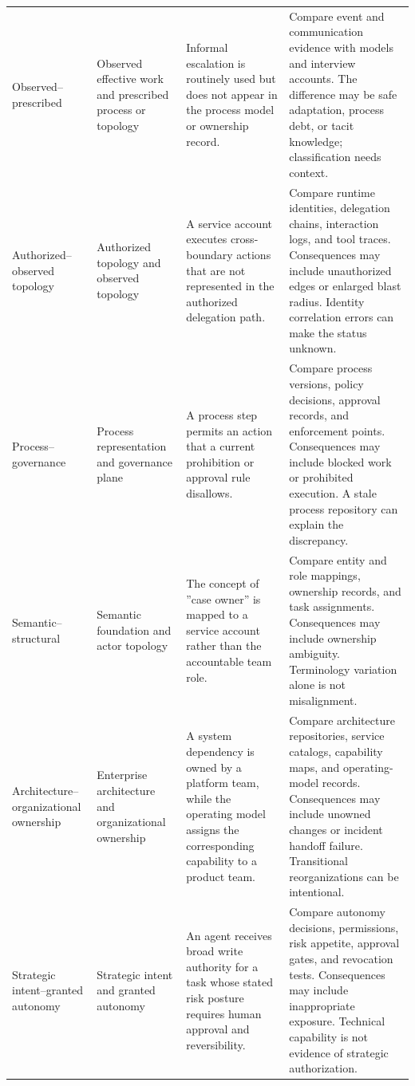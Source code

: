 \documentclass[11pt,letterpaper]{article}
\begin{document}
\begin{longtable}{P{0.15\textwidth} P{0.18\textwidth} P{0.27\textwidth} P{0.30\textwidth}}
Observed--prescribed & Observed effective work and prescribed process or topology & Informal escalation is routinely used but does not appear in the process model or ownership record. & Compare event and communication evidence with models and interview accounts. The difference may be safe adaptation, process debt, or tacit knowledge; classification needs context. \\
Authorized--observed topology & Authorized topology and observed topology & A service account executes cross-boundary actions that are not represented in the authorized delegation path. & Compare runtime identities, delegation chains, interaction logs, and tool traces. Consequences may include unauthorized edges or enlarged blast radius. Identity correlation errors can make the status unknown. \\
Process--governance & Process representation and governance plane & A process step permits an action that a current prohibition or approval rule disallows. & Compare process versions, policy decisions, approval records, and enforcement points. Consequences may include blocked work or prohibited execution. A stale process repository can explain the discrepancy. \\
Semantic--structural & Semantic foundation and actor topology & The concept of ''case owner'' is mapped to a service account rather than the accountable team role. & Compare entity and role mappings, ownership records, and task assignments. Consequences may include ownership ambiguity. Terminology variation alone is not misalignment. \\
Architecture--organizational ownership & Enterprise architecture and organizational ownership & A system dependency is owned by a platform team, while the operating model assigns the corresponding capability to a product team. & Compare architecture repositories, service catalogs, capability maps, and operating-model records. Consequences may include unowned changes or incident handoff failure. Transitional reorganizations can be intentional. \\
Strategic intent--granted autonomy & Strategic intent and granted autonomy & An agent receives broad write authority for a task whose stated risk posture requires human approval and reversibility. & Compare autonomy decisions, permissions, risk appetite, approval gates, and revocation tests. Consequences may include inappropriate exposure. Technical capability is not evidence of strategic authorization. \\
\bottomrule
\end{longtable}
\endgroup
\end{document}

